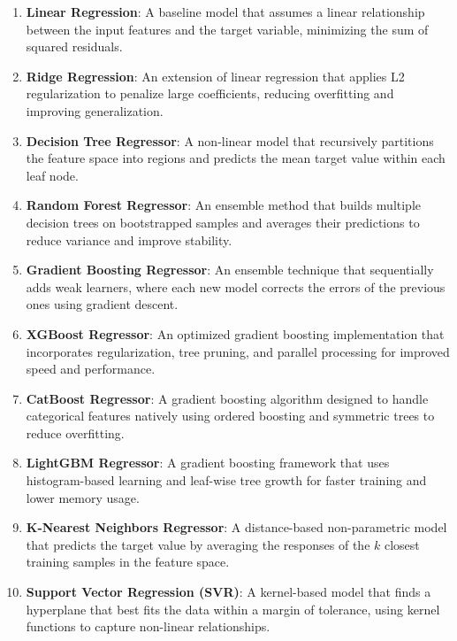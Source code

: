 \documentclass[conference]{IEEEtran}
\begin{document}
\begin{enumerate}
\item \textbf{Linear Regression}: A baseline model that assumes a linear relationship between the input features and the target variable, minimizing the sum of squared residuals.

\item \textbf{Ridge Regression}: An extension of linear regression that applies L2 regularization to penalize large coefficients, reducing overfitting and improving generalization.

\item \textbf{Decision Tree Regressor}: A non-linear model that recursively partitions the feature space into regions and predicts the mean target value within each leaf node.

\item \textbf{Random Forest Regressor}: An ensemble method that builds multiple decision trees on bootstrapped samples and averages their predictions to reduce variance and improve stability.

\item \textbf{Gradient Boosting Regressor}: An ensemble technique that sequentially adds weak learners, where each new model corrects the errors of the previous ones using gradient descent.

\item \textbf{XGBoost Regressor}: An optimized gradient boosting implementation that incorporates regularization, tree pruning, and parallel processing for improved speed and performance.

\item \textbf{CatBoost Regressor}: A gradient boosting algorithm designed to handle categorical features natively using ordered boosting and symmetric trees to reduce overfitting.

\item \textbf{LightGBM Regressor}: A gradient boosting framework that uses histogram-based learning and leaf-wise tree growth for faster training and lower memory usage.

\item \textbf{K-Nearest Neighbors Regressor}: A distance-based non-parametric model that predicts the target value by averaging the responses of the $k$ closest training samples in the feature space.

\item \textbf{Support Vector Regression (SVR)}: A kernel-based model that finds a hyperplane that best fits the data within a margin of tolerance, using kernel functions to capture non-linear relationships.
\end{enumerate}
\end{document}
